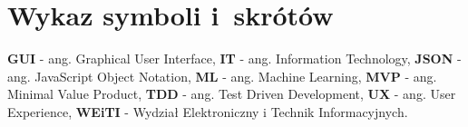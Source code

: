 \chapter*{Wykaz symboli i~skrótów}

\noindent
\textbf{GUI} - ang. Graphical User Interface, \newline
\textbf{IT} - ang. Information Technology, \newline
\textbf{JSON} - ang. JavaScript Object Notation, \newline
\textbf{ML} - ang. Machine Learning, \newline
\textbf{MVP} - ang. Minimal Value Product, \newline
\textbf{TDD} - ang. Test Driven Development, \newline
\textbf{UX} - ang. User Experience, \newline
\textbf{WEiTI} - Wydział Elektroniczny i Technik Informacyjnych. \newline

\cleardoublepage